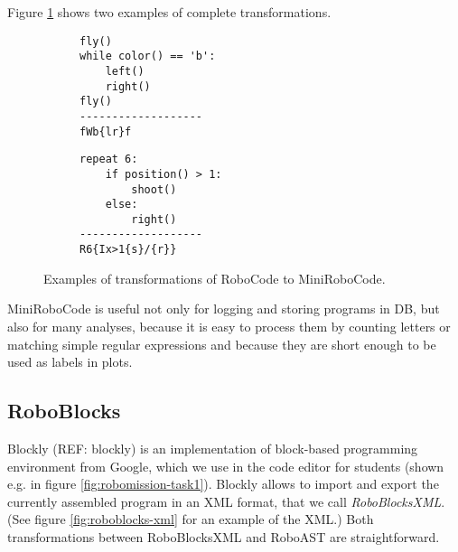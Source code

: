 Figure \ref{fig:minirobocode-transformations} shows
two examples of complete transformations.
\begin{figure}[h]
\begin{subfigure}{.49\textwidth}
{\lstset{numbers=none}
\begin{lstlisting}
fly()
while color() == 'b':
    left()
    right()
fly()
-------------------
fWb{lr}f
\end{lstlisting}}
\end{subfigure}
\begin{subfigure}{.49\textwidth}
{\lstset{numbers=none}
\begin{lstlisting}
repeat 6:
    if position() > 1:
        shoot()
    else:
        right()
-------------------
R6{Ix>1{s}/{r}}
\end{lstlisting}}
\end{subfigure}
\caption{Examples of transformations of RoboCode to MiniRoboCode.}
\label{fig:minirobocode-transformations}
\end{figure}

MiniRoboCode is useful not only for logging and storing programs in DB,
but also for many analyses,
because it is easy to process them by counting letters or matching simple regular expressions
and because they are short enough to be used as labels in plots.


\subsection{RoboBlocks}

Blockly (REF: blockly) is an implementation of block-based programming
environment from Google,
which we use in the code editor for students
(shown e.g. in figure \ref{fig:robomission-task1}).
Blockly allows to import and export the currently assembled program in
an XML format, that we call \emph{RoboBlocksXML}.
(See figure \ref{fig:roboblocks-xml} for an example of the XML.)
Both transformations between RoboBlocksXML and RoboAST are straightforward.


